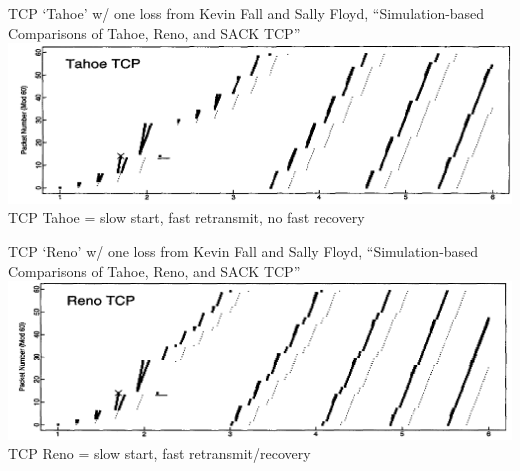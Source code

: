 \begin{frame}{TCP `Tahoe' w/ one loss}
\tiny from Kevin Fall and Sally Floyd, ``Simulation-based Comparisons of Tahoe, Reno, and SACK TCP'' \\
\includegraphics[width=\textwidth]{../congest/fall-floyd-fig2-tahoe} \\
TCP Tahoe = slow start, fast retransmit, no fast recovery 
\end{frame}

\begin{frame}{TCP `Reno' w/ one loss}
\tiny from Kevin Fall and Sally Floyd, ``Simulation-based Comparisons of Tahoe, Reno, and SACK TCP'' \\
\includegraphics[width=\textwidth]{../congest/fall-floyd-fig2-reno}
TCP Reno = slow start, fast retransmit/recovery
\end{frame}
